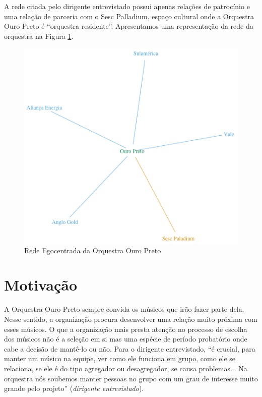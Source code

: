 \documentclass[a4paper, 12pt, openright, oneside, german, french, english, brazil]{abntex2}
\begin{document}
	A rede citada pelo dirigente entrevistado possui apenas relações de patrocínio e uma relação de parceria com o Sesc Palladium, espaço cultural onde a Orquestra Ouro Preto é ``orquestra residente''. Apresentamos uma representação da rede da orquestra na Figura \ref{rede-ouropreto}.
	
	\begin{figure}[!ht]
		\centering
		\caption{Rede Egocentrada da Orquestra Ouro Preto}
		\label{rede-ouropreto}
		\includegraphics[scale=.7]{rede_ouropreto.png}
	\end{figure}
	
	
	\section{Motivação}
	
	A Orquestra Ouro Preto sempre convida os músicos que irão fazer parte dela. Nesse sentido, a organização procura desenvolver uma relação muito próxima com esses músicos. O que a organização mais presta atenção no processo de escolha dos músicos não é a seleção em si mas uma espécie de período probatório onde cabe a decisão de mantê-lo ou não. Para o dirigente entrevistado, ``é crucial, para manter um músico na equipe, ver como ele funciona em grupo, como ele se relaciona, se ele é do tipo agregador ou desagregador, se causa problemas... Na orquestra nós soubemos manter pessoas no grupo com um grau de interesse muito grande pelo projeto'' (\textit{dirigente entrevistado}).
	
\end{document}
